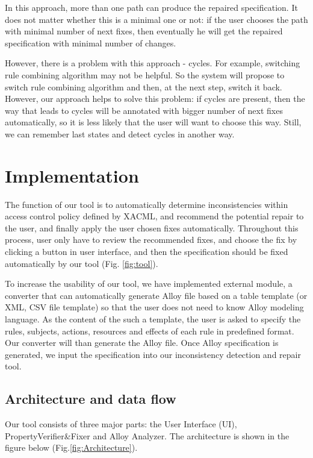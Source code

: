 \documentclass{acm_proc_article-sp}
\begin{document}
In this approach, more than one path can produce the repaired specification. It does not matter whether this is a minimal one or not: if the user chooses the path with minimal number of next fixes, then eventually he will get the repaired specification with minimal number of changes.

However, there is a problem with this approach - cycles. For example, switching rule combining algorithm may not be helpful. So the system will propose to switch rule combining algorithm and then, at the next step, switch it back. However, our approach helps to solve this problem: if cycles are present, then the way that leads to cycles will be annotated with bigger number of next fixes automatically, so it is less likely that the user will want to choose this way. Still, we can remember last states and detect cycles in another way.

\section{Implementation}
The function of our tool is to automatically determine inconsistencies within access control policy defined by XACML, and recommend the potential repair to the user, and finally apply the user chosen fixes automatically. Throughout this process, user only have to review the recommended fixes, and choose the fix by clicking a button in user interface, and then the specification should be fixed automatically by our tool (Fig. \ref{fig:tool}). 

To increase the usability of our tool, we have implemented external module, a converter that can automatically generate Alloy file based on a table template (or XML, CSV file template) so that the user does not need to know Alloy modeling language. As the content of the such a template, the user is asked to specify the rules, subjects, actions, resources and effects of each rule in predefined format. Our converter will than generate the Alloy file. Once Alloy specification is generated, we input the specification into our inconsistency detection and repair tool. 

\subsection{Architecture and data flow}

Our tool consists of three major parts: the User Interface (UI), PropertyVerifier\&Fixer and Alloy Analyzer. The architecture is shown in the figure below (Fig.\ref{fig:Architecture}).\\
\end{document}
